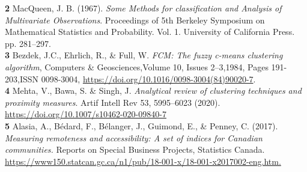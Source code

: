 \documentclass[11pt, a4paper]{article}
\begin{document}
\noindent\textbf{2} MacQueen, J. B. (1967). \textit{Some Methods for classification and Analysis of Multivariate Observations}. Proceedings of 5th Berkeley Symposium on Mathematical Statistics and Probability. Vol. 1. University of California Press. pp. 281–297. \\ 

\noindent\textbf{3} Bezdek, J.C., Ehrlich, R., \& Full, W. \textit{FCM: The fuzzy c-means clustering algorithm}, Computers \& Geosciences,Volume 10, Issues 2–3,1984, Pages 191-203,ISSN 0098-3004, \sloppy\url{https://doi.org/10.1016/0098-3004(84)90020-7}. \\ %

\noindent\textbf{4} Mehta, V., Bawa, S. \& Singh, J. \textit{Analytical review of clustering techniques and proximity measures}. Artif Intell Rev 53, 5995–6023 (2020). \sloppy\url{https://doi.org/10.1007/s10462-020-09840-7} \\


\noindent\textbf{5} Alasia, A., Bédard, F., Bélanger, J., Guimond, E., \& Penney, C. (2017). \textit{Measuring remoteness and accessibility: A set of indices for Canadian communities.} Reports on Special Business Projects, Statistics Canada. \sloppy\url{https://www150.statcan.gc.ca/n1/pub/18-001-x/18-001-x2017002-eng.htm.} \\
\end{document}
